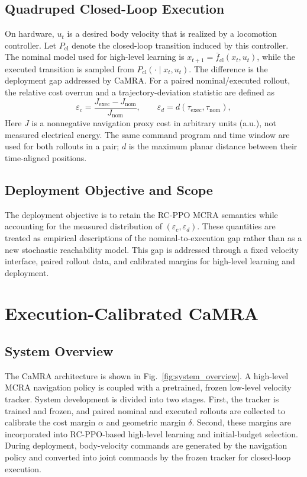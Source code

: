 \documentclass[conference]{IEEEtran}
\begin{document}
\subsection{Quadruped Closed-Loop Execution}
On hardware, $u_t$ is a desired body velocity that is realized by a locomotion
controller. Let $P_{\mathrm{cl}}$ denote the closed-loop transition induced by
this controller. The nominal model used for high-level learning is
$x_{t+1}=\bar f_{\mathrm{cl}}(x_t,u_t)$, while the executed transition is sampled
from $P_{\mathrm{cl}}(\cdot\mid x_t,u_t)$. The difference is the deployment gap
addressed by CaMRA. For a paired nominal/executed rollout, the relative
cost overrun and a trajectory-deviation statistic are defined as
\begin{equation}
\varepsilon_c=\frac{J_{\mathrm{exec}}-J_{\mathrm{nom}}}{J_{\mathrm{nom}}},
\qquad
\varepsilon_d=d(\tau_{\mathrm{exec}},\tau_{\mathrm{nom}}),
\label{eq:execution_errors}
\end{equation}
Here $J$ is a nonnegative navigation proxy cost in arbitrary units (a.u.),
not measured electrical energy. The same command program and time window are
used for both rollouts in a pair;
$d$ is the maximum planar distance between their time-aligned positions.

\subsection{Deployment Objective and Scope}
The deployment objective is to retain the RC-PPO MCRA semantics while accounting
for the measured distribution of $(\varepsilon_c,\varepsilon_d)$. These quantities
are treated as empirical descriptions of the nominal-to-execution gap rather
than as a new stochastic reachability model. This gap is addressed through a
fixed velocity interface, paired rollout data, and calibrated margins for
high-level learning and deployment.

\section{Execution-Calibrated CaMRA}
\subsection{System Overview}
The CaMRA architecture is shown in Fig.~\ref{fig:system_overview}. A high-level
MCRA navigation policy is coupled with a pretrained, frozen low-level velocity
tracker. System development is divided into two stages. First, the tracker is
trained and frozen, and paired nominal and executed rollouts are collected to calibrate the
cost margin $\alpha$ and geometric margin $\delta$. Second, these margins are
incorporated into RC-PPO-based high-level learning and initial-budget selection.
During deployment, body-velocity commands are generated by the navigation policy
and converted into joint commands by the frozen tracker for closed-loop execution.
\end{document}
